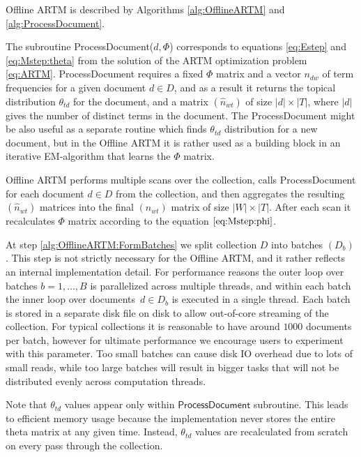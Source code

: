 \documentclass[russian,english]{llncs}
\newcommand{\kw}[1]{\textsf{#1}}
\begin{document}
\kw{Offline ARTM} is described by Algorithms \ref{alg:OfflineARTM} and \ref{alg:ProcessDocument}.

The subroutine \kw{ProcessDocument($d, \Phi$)} corresponds to equations \eqref{eq:Estep} and \eqref{eq:Mstep:theta} from the solution of the ARTM optimization problem \eqref{eq:ARTM}.
\kw{ProcessDocument} requires a fixed $\Phi$ matrix
and a vector $n_{dw}$ of term frequencies for a given document $d \in D$,
and as a result it returns the topical distribution $\theta_{td}$ for the document,
and a matrix $(\hat n_{wt})$ of size $|d| \times |T|$,
where $|d|$ gives the number of distinct terms in the document.
The \kw{ProcessDocument} might be also useful as a separate routine which finds $\theta_{td}$ distribution for a new document,
but in the \kw{Offline ARTM} it is rather used as a building block in an iterative EM-algorithm that learns the $\Phi$ matrix.

\kw{Offline ARTM} performs multiple scans over the collection, calls \kw{ProcessDocument}
for each document $d \in D$ from the collection,
and then aggregates the resulting $(\hat n_{wt})$ matrices into the final $(n_{wt})$ matrix of size $|W| \times |T|$.
After each scan it recalculates $\Phi$ matrix according to the equation $\eqref{eq:Mstep:phi}$.


At step \ref{alg:OfflineARTM:FormBatches} we split collection $D$ into batches $(D_b)$.
This step is not strictly necessary for the \kw{Offline ARTM},
and it rather reflects an internal implementation detail.
For performance reasons the outer loop over batches $b = 1, \dots, B$ is parallelized across multiple threads,
and within each batch the inner loop over documents~$d \in D_b$
is executed in a single thread.
Each batch is stored in a separate disk file on disk to allow out-of-core streaming of the collection.
For typical collections it is reasonable to have around $1000$ documents per batch,
however for ultimate performance we encourage users to experiment with this parameter.
Too small batches can cause disk IO overhead due to lots of small reads,
while too large batches will result in bigger tasks that will not be distributed evenly across computation threads.

Note that $\theta_{td}$ values appear only within $\kw{ProcessDocument}$ subroutine.
This leads to efficient memory usage because the implementation never stores the entire theta matrix at any given time.
Instead, $\theta_{td}$ values are recalculated from scratch on every pass through the collection.
\end{document}
